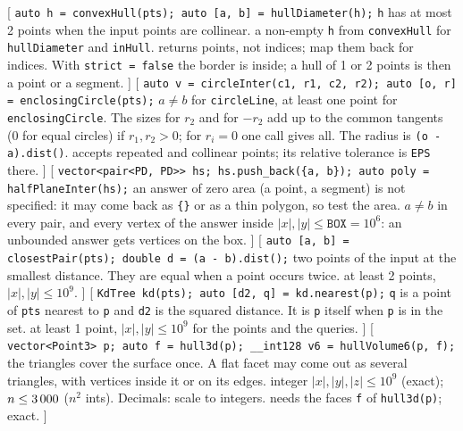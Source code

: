 [
	 \texttt{auto h = convexHull(pts); auto [a, b] = hullDiameter(h);}
	 \texttt{h} has at most 2 points when the input points are collinear.
	 a non-empty \texttt{h} from \texttt{convexHull} for \texttt{hullDiameter} and \texttt{inHull}.
	 returns points, not indices; map them back for indices.
	 With \texttt{strict = false} the border is inside; a hull of 1 or 2 points is then a point or a segment.
]\label{convexhull}
[
	 \texttt{auto v = circleInter(c1, r1, c2, r2); auto [o, r] = enclosingCircle(pts);}
	 $a \ne b$ for \texttt{circleLine}, at least one point for \texttt{enclosingCircle}.
	 The sizes for $r_2$ and for $-r_2$ add up to the common tangents (0 for equal circles) if $r_1, r_2 > 0$; for $r_i = 0$ one call gives all.
	 The radius is \texttt{(o - a).dist()}.
	 accepts repeated and collinear points; its relative tolerance is \texttt{EPS} there.
]\label{circle}
[
	 \texttt{vector<pair<PD, PD>> hs; hs.push\_back(\{a, b\}); auto poly = halfPlaneInter(hs);}
	 an answer of zero area (a point, a segment) is not specified: it may come back as \texttt{\{\}} or as a thin polygon, so test the area.
	 $a \ne b$ in every pair, and every vertex of the answer inside $|x|, |y| \le \texttt{BOX} = 10^6$: an unbounded answer gets vertices on the box.
]\label{halfplane}
[
	 \texttt{auto [a, b] = closestPair(pts); double d = (a - b).dist();}
	 two points of the input at the smallest distance. They are equal when a point occurs twice.
	 at least 2 points, $|x|, |y| \le 10^9$.
]\label{closestpair}
[
	 \texttt{KdTree kd(pts); auto [d2, q] = kd.nearest(p);}
	 \texttt{q} is a point of \texttt{pts} nearest to \texttt{p} and \texttt{d2} is the squared distance. It is \texttt{p} itself when \texttt{p} is in the set.
	 at least 1 point, $|x|, |y| \le 10^9$ for the points and the queries.
]\label{kdtree}
[
	 \texttt{vector<Point3> p; auto f = hull3d(p); \_\_int128 v6 = hullVolume6(p, f);}
	 the triangles cover the surface once. A flat facet may come out as several triangles, with vertices inside it or on its edges.
	 integer $|x|, |y|, |z| \le 10^9$ (exact); $n \le 3\,000$ ($n^2$ ints). Decimals: scale to integers.
	 needs the faces \texttt{f} of \texttt{hull3d(p)}; exact.
]\label{hull3d}
